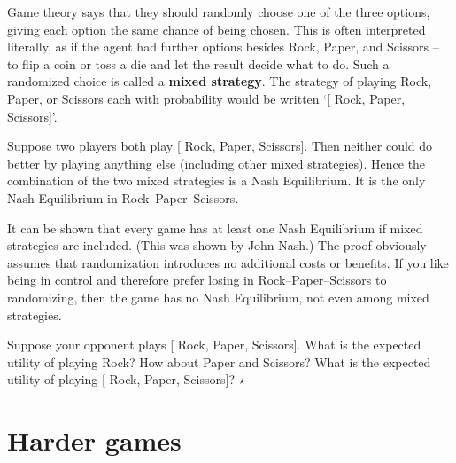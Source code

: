 Game theory says that they should randomly choose one of the three
options, giving each option the same chance of being chosen. This is
often interpreted literally, as if the agent had further options
besides Rock, Paper, and Scissors -- to flip a coin or toss a die and
let the result decide what to do. Such a randomized choice is called a
\textbf{mixed strategy}. The strategy of playing Rock, Paper, or
Scissors each with probability  would be written
`[ Rock,  Paper, 
Scissors]'.

Suppose two players both play [ Rock, 
Paper,  Scissors]. Then neither could do better by
playing anything else (including other mixed strategies). Hence the
combination of the two mixed strategies is a Nash Equilibrium. It is
the only Nash Equilibrium in Rock--Paper--Scissors.

It can be shown that every game has at least one Nash Equilibrium if
mixed strategies are included. (This was shown by John Nash.) The
proof obviously assumes that randomization introduces no additional
costs or benefits. If you like being in control and therefore prefer
losing in Rock--Paper--Scissors to randomizing, then the game has no
Nash Equilibrium, not even among mixed strategies.

\begin{exercise}
  Suppose your opponent plays [ Rock, 
  Paper,  Scissors]. What is the expected utility of
  playing Rock? How about Paper and Scissors? What is the expected
  utility of playing [ Rock, 
  Paper,  Scissors]? $\star$
\end{exercise}

\section{Harder games}

